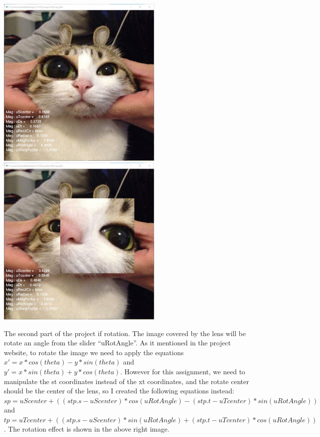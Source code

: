 \documentclass[letterpaper,14pt,titlepage,fleqn]{article}
\begin{document}
\begin{center}
	\includegraphics[width=3.2in]{mag.jpg}
	\includegraphics[width=3.2in]{rotate.jpg}
\end{center}
The second part of the project if rotation. The image covered by the lens will be rotate an angle from the slider ``uRotAngle''. As it mentioned in the project website, to rotate the image we need to apply the equations $x' = x*cos(theta) - y*sin(theta)$ and $y' = x*sin(theta) + y*cos(theta)$. However for this assignment, we need to manipulate the st coordinates instead of the xt coordinates, and the rotate center should be the center of the lens, so I created the following equations instead: $sp = uScenter+((stp.s-uScenter)*cos(uRotAngle)-(stp.t-uTcenter)*sin(uRotAngle))$ and $tp = uTcenter+((stp.s-uScenter)*sin(uRotAngle)+(stp.t-uTcenter)*cos(uRotAngle))$. The rotation effect is shown in the above right image.
\end{document}
